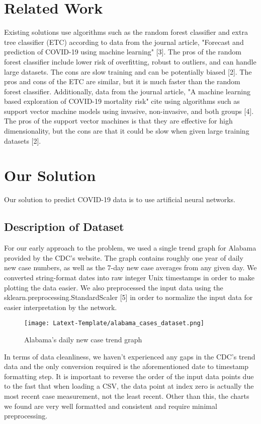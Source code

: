 \documentclass[conference]{IEEEtran}
\begin{document}
\section{Related Work}
Existing solutions use algorithms such as the random forest classifier and extra tree classifier (ETC) according to data from the journal article, "Forecast and prediction of COVID-19 using machine learning" [3]. The pros of the random forest classifier include lower risk of overfitting, robust to outliers, and can handle large datasets. The cons are slow training and can be potentially biased [2]. The pros and cons of the ETC are similar, but it is much faster than the random forest classifier. Additionally, data from the journal article, "A machine learning based exploration of COVID-19 mortality risk" cite using algorithms such as support vector machine models using invasive, non-invasive, and both groups [4]. The pros of the support vector machines is that they are effective for high dimensionality, but the cons are that it could be slow when given large training datasets [2].

\section{Our Solution}
Our solution to predict COVID-19 data is to use artificial neural networks.

\subsection{Description of Dataset}
For our early approach to the problem, we used a single trend graph for Alabama provided by the CDC's website. The graph contains roughly one year of daily new case numbers, as well as the 7-day new case averages from any given day. We converted string-format dates into raw integer Unix timestamps in order to make plotting the data easier. We also preprocessed the input data using the sklearn.preprocessing.StandardScaler [5] in order to normalize the input data for easier interpretation by the network.

\begin{figure}
    \centering
    \texttt{[image: Latext-Template/alabama\_cases\_dataset.png]}
    \caption{Alabama's daily new case trend graph}
    \label{fig:input_dataset}
\end{figure}

In terms of data cleanliness, we haven't experienced any gaps in the CDC's trend data and the only conversion required is the aforementioned date to timestamp formatting step. It is important to reverse the order of the input data points due to the fast that when loading a CSV, the data point at index zero is actually the most recent case measurement, not the least recent. Other than this, the charts we found are very well formatted and consistent and require minimal preprocessing.
\end{document}
